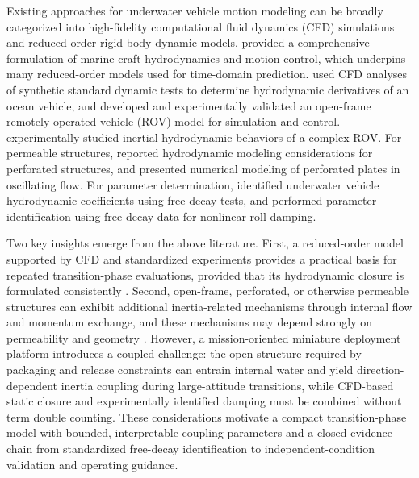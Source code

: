 Existing approaches for underwater vehicle motion modeling can be broadly categorized into high-fidelity computational fluid dynamics (CFD) simulations and reduced-order rigid-body dynamic models. \citet{Fossen2011HandbookMarineCraft} provided a comprehensive formulation of marine craft hydrodynamics and motion control, which underpins many reduced-order models used for time-domain prediction. \citet{AminiForoushani2021HydrodynamicDerivativesCFD} used CFD analyses of synthetic standard dynamic tests to determine hydrodynamic derivatives of an ocean vehicle, and \citet{Chin2018OpenFrameROVVirtualReality} developed and experimentally validated an open-frame remotely operated vehicle (ROV) model for simulation and control. \citet{Xu2017InertialHydrodynamicROV} experimentally studied inertial hydrodynamic behaviors of a complex ROV. For permeable structures, \citet{Molin2011HydrodynamicModelingPerforated} reported hydrodynamic modeling considerations for perforated structures, and \citet{Mentzoni2019NumericalModelingPerforatedPlates} presented numerical modeling of perforated plates in oscillating flow. For parameter determination, \citet{Ross2004IdentificationUUVHydrodynamicCoefficients} identified underwater vehicle hydrodynamic coefficients using free-decay tests, and \citet{Sun2021NonlinearRollDampingFreeDecay} performed parameter identification using free-decay data for nonlinear roll damping.

Two key insights emerge from the above literature. First, a reduced-order model supported by CFD and standardized experiments provides a practical basis for repeated transition-phase evaluations, provided that its hydrodynamic closure is formulated consistently \citep{Fossen2011HandbookMarineCraft,AminiForoushani2021HydrodynamicDerivativesCFD,Ross2004IdentificationUUVHydrodynamicCoefficients}. Second, open-frame, perforated, or otherwise permeable structures can exhibit additional inertia-related mechanisms through internal flow and momentum exchange, and these mechanisms may depend strongly on permeability and geometry \citep{Molin2011HydrodynamicModelingPerforated,Mentzoni2019NumericalModelingPerforatedPlates,Xu2017InertialHydrodynamicROV}. However, a mission-oriented miniature deployment platform introduces a coupled challenge: the open structure required by packaging and release constraints can entrain internal water and yield direction-dependent inertia coupling during large-attitude transitions, while CFD-based static closure and experimentally identified damping must be combined without term double counting. These considerations motivate a compact transition-phase model with bounded, interpretable coupling parameters and a closed evidence chain from standardized free-decay identification to independent-condition validation and operating guidance.

